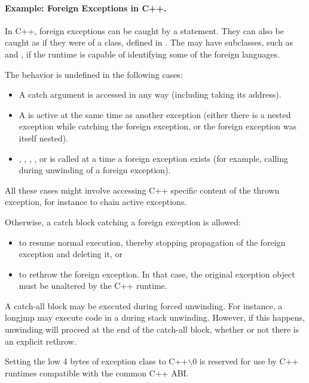 \paragraph{Example: Foreign Exceptions in C++.} In C++, foreign exceptions can be 
caught by a  statement. They can also be caught as if they
were of a  class, defined in . The
 may have subclasses, such as
 and , if the runtime is capable
of identifying some of the foreign languages.

The behavior is undefined in the following cases: 
\begin{itemize}
\item A  catch argument is accessed in any way 
     (including taking its address). 

\item A  is active at the same time as another 
     exception (either there is a nested exception while catching the
     foreign exception, or the foreign exception was itself nested). 
     
\item {}, ,
     , , or
      is called at a time a foreign exception
     exists (for example, calling  during
     unwinding of a foreign exception).
\end{itemize}

All these cases might involve accessing C++ specific content of the 
thrown exception, for instance to chain active exceptions. 

Otherwise, a catch block catching a foreign exception is allowed: 
\begin{itemize}
\item to resume normal execution, thereby stopping propagation of 
      the foreign exception and deleting it, or 
\item to rethrow the foreign exception. In that case, the original 
      exception object must be unaltered by the C++ runtime. 
\end{itemize}

A catch-all block may be executed during forced unwinding.  For
instance, a longjmp may execute code in a  during
stack unwinding. However, if this happens, unwinding will proceed at
the end of the catch-all block, whether or not there is an explicit
rethrow.

Setting the low 4 bytes of exception class to C++$\backslash$0 is reserved 
for use by C++ runtimes compatible with the common C++ ABI. 

